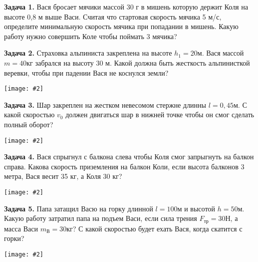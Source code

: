 \documentclass{article}
\newcommand{\pdt}[1]{
	\par
	\begin{minipage}{.95\linewidth}
	\setlength{\parindent}{2em}
	{#1}
	\end{minipage}
	\linebreak
}
\newcommand{\pdtpr}[4]{
	\par
	\begin{minipage}{#3\linewidth}
	\setlength{\parindent}{2em}
	{#1}
	\end{minipage}
	\begin{minipage}{#4\linewidth}
	{\texttt{[image: \#2]}}
	\end{minipage}
	\linebreak
}
\begin{document}
\pdt{
\Large\textbf{Задача 1.}
 {Вася бросает мячики массой 30 г в мишень которую держит Коля на высоте 0,8 м выше Васи.  Считая что стартовая скорость мячика 5 м/с, определите минимальную скорость мячика при попадании в мишень. Какую работу нужно совершить Коле чтобы поймать 3 мячика?}
 }
 \linebreak
\pdtpr{
\Large\textbf{Задача 2.}
{Страховка альпиниста закреплена на высоте $h_1=20\text{м}$. Вася массой $m=40\text{кг}$ забрался на высоту 30 м. Какой должна быть жесткость альпинисткой веревки, чтобы при падении Вася не коснулся земли? 
}}
{alpin.png}{.6}{.35}
\linebreak
\pdtpr{
\Large\textbf{Задача 3.}
{Шар закреплен на жестком невесомом стержне длинны $l = 0,45\text{м}$. С какой скоростью $v_0$ должен двигаться шар в нижней точке чтобы он смог сделать полный оборот?
}}
{ball.png}{.6}{.35}
\linebreak
\pdtpr{
\Large\textbf{Задача 4.}
{Вася спрыгнул с балкона слева чтобы Коля смог запрыгнуть на балкон справа. Какова скорость приземления на балкон Коли, если высота балконов 3 метра, Вася весит 35 кг, а Коля 30 кг?
}}
{balcon.png}{.6}{.35}
\linebreak
\pdtpr{
\Large\textbf{Задача 5.}
{
Папа затащил Васю на горку длинной $l=100\text{м}$ и высотой  $h=50\text{м}$. Какую работу затратил папа на подъем Васи, если сила трения $F_\text{тр}=30\text{Н}$, а масса Васи $m_\text{В}=30\text{кг}$? С какой скоростью будет ехать Вася, когда скатится с горки?
}}
{gorka.png}{.6}{.35}
\end{document}

